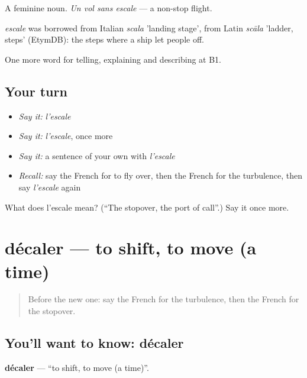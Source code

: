 A feminine noun. \emph{Un vol sans escale} — a non-stop flight.

\begin{cousinweb}
\emph{escale} was borrowed from Italian \emph{scala} 'landing stage', from Latin \emph{scāla} 'ladder, steps' (EtymDB): the steps where a ship let people off.
\end{cousinweb}

\begin{grammarlens}[title={What you've built}]
One more word for telling, explaining and describing at B1.
\end{grammarlens}

\subsection*{Your turn}
\begin{itemize}
\raggedright
  \item \emph{Say it:} \emph{l'escale}
  \item \emph{Say it:} \emph{l'escale}, once more
  \item \emph{Say it:} a sentence of your own with \emph{l'escale}
  \item \emph{Recall:} say the French for to fly over, then the French for the turbulence, then say \emph{l'escale} again
\end{itemize}

\begin{tcolorbox}[breakable,colback=teal!4,colframe=teal!35!black,title={Before you move on}]
What does l'escale mean? (\textquotedblleft{}The stopover, the port of call\textquotedblright{}.) Say it once more.
\end{tcolorbox}
\section[décaler]{décaler — to shift, to move (a time)}

\label{lesson:FR-C420-decaler}



\begin{quote}
Before the new one: say the French for the turbulence, then the French for the stopover.
\end{quote}

\subsection*{You'll want to know: décaler}
\textbf{décaler} — \textquotedblleft{}to shift, to move (a time)\textquotedblright{}.

